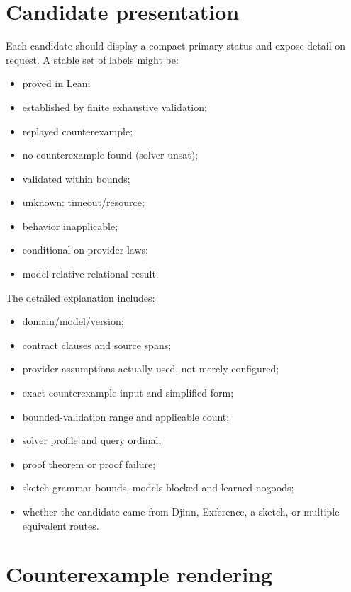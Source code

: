\documentclass[11pt,oneside]{report}
\begin{document}
\section{Candidate presentation}

Each candidate should display a compact primary status and expose detail on request. A stable set of labels might be:

\begin{itemize}[leftmargin=2em]
\item \textsf{proved in Lean};
\item \textsf{established by finite exhaustive validation};
\item \textsf{replayed counterexample};
\item \textsf{no counterexample found (solver unsat)};
\item \textsf{validated within bounds};
\item \textsf{unknown: timeout/resource};
\item \textsf{behavior inapplicable};
\item \textsf{conditional on provider laws};
\item \textsf{model-relative relational result}.
\end{itemize}

The detailed explanation includes:

\begin{itemize}[leftmargin=2em]
\item domain/model/version;
\item contract clauses and source spans;
\item provider assumptions actually used, not merely configured;
\item exact counterexample input and simplified form;
\item bounded-validation range and applicable count;
\item solver profile and query ordinal;
\item proof theorem or proof failure;
\item sketch grammar bounds, models blocked and learned nogoods;
\item whether the candidate came from Djinn, Exference, a sketch, or multiple equivalent routes.
\end{itemize}

\section{Counterexample rendering}
\end{document}
